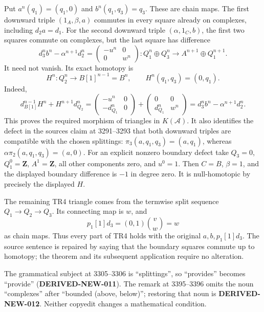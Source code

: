 \documentclass[11pt]{article}
\begin{document}
Put \(a^n(q_1)=(q_1,0)\) and \(b^n(q_1,q_3)=q_3\). These are chain maps. The first downward triple \((1_A,\beta,a)\) commutes in every square already on complexes,\allowbreak{} including \(d_2a=d_1\). For the second downward triple \((\alpha,1_C,b)\),\allowbreak{} the first two squares commute on complexes,\allowbreak{} but the last square has difference \[
d_3^nb^n-\alpha^{n+1}d_2^n
=\begin{pmatrix}-u^n&0\\0&w^n\end{pmatrix}:
Q_1^n\oplus Q_3^n\to A^{n+1}\oplus Q_1^{n+1}.
\] It need not vanish. Its exact homotopy is \[
H^n:Q_2^n\longrightarrow B[1]^{n-1}=B^n,
\qquad H^n(q_1,q_3)=(0,q_1).
\] Indeed,\allowbreak{} \[
d_{B[1]}^{n-1}H^n+H^{n+1}d_{Q_2}^n
=\begin{pmatrix}-u^n&0\\-d_{Q_1}^n&0\end{pmatrix}
+\begin{pmatrix}0&0\\d_{Q_1}^n&w^n\end{pmatrix}
=d_3^nb^n-\alpha^{n+1}d_2^n.
\] This proves the required morphism of triangles in \(K(\mathcal A)\). It also identifies the defect in the source\textquotesingle s claim at 3291–\allowbreak{}3293 that both downward triples are compatible with the chosen splittings:\allowbreak{} \(\pi_3(a,q_1,q_3)=(a,q_1)\),\allowbreak{} whereas \(\alpha\pi_2(a,q_1,q_3)=(a,0)\). For an explicit nonzero boundary defect take \(Q_3=0\),\allowbreak{} \(Q_1^0=\mathbf Z\),\allowbreak{} \(A^1=\mathbf Z\),\allowbreak{} all other components zero,\allowbreak{} and \(u^0=1\). Then \(C=B\),\allowbreak{} \(\beta=1\),\allowbreak{} and the displayed boundary difference is \(-1\) in degree zero. It is null-homotopic by precisely the displayed \(H\).

The remaining TR4 triangle comes from the termwise split sequence \(Q_1\to Q_2\to Q_3\). Its connecting map is \(w\),\allowbreak{} and \[
p_1[1]d_3=(0,1)\binom v w=w
\] as chain maps. Thus every part of TR4 holds with the original \(a,b,p_1[1]d_3\). The source sentence is repaired by saying that the boundary squares commute up to homotopy; the theorem and its subsequent application require no alteration.

The grammatical subject at 3305–\allowbreak{}3306 is “splittings”,\allowbreak{} so ``provides'' becomes ``provide'' (\textbf{DERIVED-NEW-011})\allowbreak{}. The remark at 3395–\allowbreak{}3396 omits the noun ``complexes'' after ``bounded (above,\allowbreak{} below)\allowbreak{}”; restoring that noun is \textbf{DERIVED-NEW-012}. Neither copyedit changes a mathematical condition.
\end{document}
